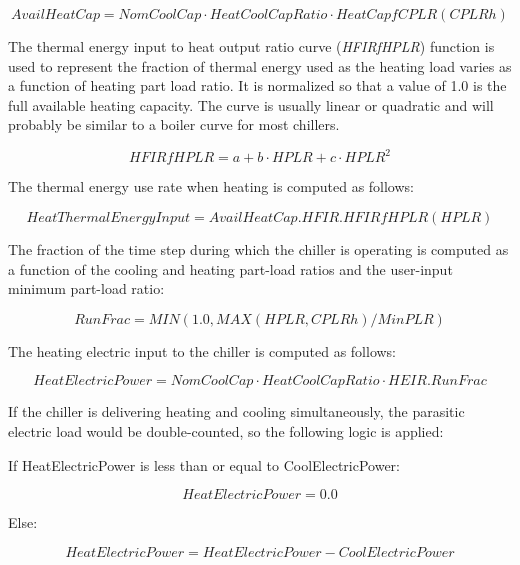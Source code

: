 \begin{equation}
AvailHeatCap = NomCoolCap \cdot HeatCoolCapRatio \cdot HeatCapfCPLR(CPLRh)
\end{equation}

The thermal energy input to heat output ratio curve (\emph{HFIRfHPLR}) function is used to represent the fraction of thermal energy used as the heating load varies as a function of heating part load ratio. It is normalized so that a value of 1.0 is the full available heating capacity. The curve is usually linear or quadratic and will probably be similar to a boiler curve for most chillers.

\begin{equation}
HFIRfHPLR = a + b \cdot HPLR + c \cdot HPL{R^2}
\end{equation}

The thermal energy use rate when heating is computed as follows:

\begin{equation}
HeatThermalEnergyInput = AvailHeatCap.HFIR.HFIRfHPLR(HPLR)
\end{equation}

The fraction of the time step during which the chiller is operating is computed as a function of the cooling and heating part-load ratios and the user-input minimum part-load ratio:

\begin{equation}
RunFrac = MIN(1.0,MAX\left( {HPLR,CPLRh} \right)/MinPLR)
\end{equation}

The heating electric input to the chiller is computed as follows:

\begin{equation}
HeatElectricPower = NomCoolCap \cdot HeatCoolCapRatio \cdot HEIR.RunFrac
\end{equation}

If the chiller is delivering heating and cooling simultaneously, the parasitic electric load would be double-counted, so the following logic is applied:

If HeatElectricPower is less than or equal to CoolElectricPower:

\begin{equation}
  HeatElectricPower = 0.0
\end{equation}

Else:

\begin{equation}
  HeatElectricPower = HeatElectricPower - CoolElectricPower
\end{equation}

